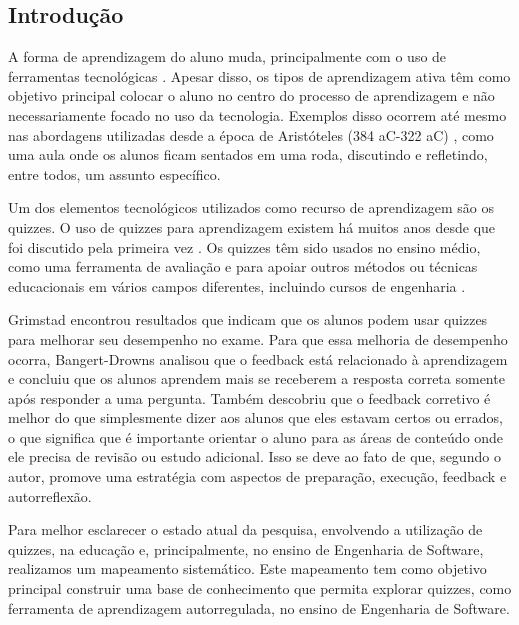 \subsection{Introdução}

A forma de aprendizagem do aluno muda, principalmente com o uso de ferramentas tecnológicas \cite{nilson_creating_2013, fink_creating_2013, ebert_school_2013}. Apesar disso, os tipos de aprendizagem ativa têm como objetivo principal colocar o aluno no centro do processo de aprendizagem e não necessariamente focado no uso da tecnologia. Exemplos disso ocorrem até mesmo nas abordagens utilizadas desde a época de Aristóteles (384 aC-322 aC) \cite{berge_computer_1995}, como uma aula onde os alunos ficam sentados em uma roda, discutindo e refletindo, entre todos, um assunto específico.

Um dos elementos tecnológicos utilizados como recurso de aprendizagem são os quizzes. O uso de quizzes para aprendizagem existem há muitos anos desde que foi discutido pela primeira vez \cite{mawhinney_comparison_1971}. Os quizzes têm sido usados no ensino médio, como uma ferramenta de avaliação e para apoiar outros métodos ou técnicas educacionais em vários campos diferentes, incluindo cursos de engenharia \cite{herold_student_2012, thevathayan_imparting_2017, figueiredo_evaluation_2014}. 

Grimstad \cite {grimstad_are_2004} encontrou resultados que indicam que os alunos podem usar quizzes para melhorar seu desempenho no exame. Para que essa melhoria de desempenho ocorra, Bangert-Drowns \cite {bangert-drowns_instructional_1991} analisou que o feedback está relacionado à aprendizagem e concluiu que os alunos aprendem mais se receberem a resposta correta somente após responder a uma pergunta. Também descobriu que o feedback corretivo é melhor do que simplesmente dizer aos alunos que eles estavam certos ou errados, o que significa que é importante orientar o aluno para as áreas de conteúdo onde ele precisa de revisão ou estudo adicional. Isso se deve ao fato de que, segundo o autor, promove uma estratégia com aspectos de preparação, execução, feedback e autorreflexão.

Para melhor esclarecer o estado atual da pesquisa, envolvendo a utilização de quizzes, na educação e, principalmente, no ensino de Engenharia de Software, realizamos um mapeamento sistemático. Este mapeamento tem como objetivo principal construir uma base de conhecimento que permita explorar quizzes, como ferramenta de aprendizagem autorregulada, no ensino de Engenharia de Software.

